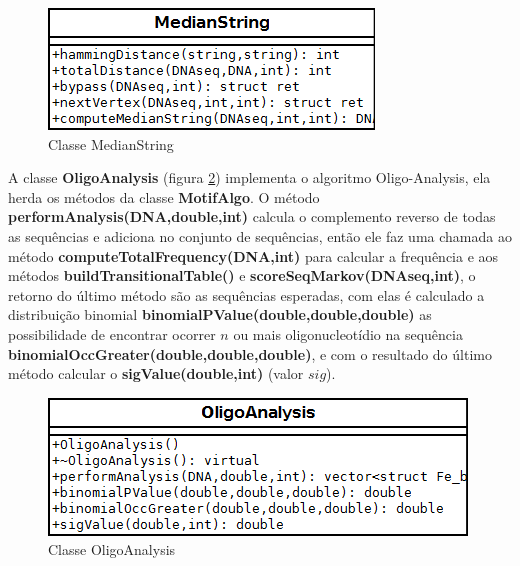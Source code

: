 \begin{figure}[htb!]
    \centering
    \includegraphics[scale=0.7]{./imagens/MedianString.png}
    \caption{Classe MedianString}
    \label{fig:MedianString}
\end{figure}


A classe \textbf{OligoAnalysis} (figura \ref{fig:OligoAnalysis}) implementa o algoritmo Oligo-Analysis, ela herda os métodos da classe \textbf{MotifAlgo}. O método \textbf{performAnalysis(DNA,double,int)} calcula o complemento reverso de todas as sequências e adiciona no conjunto de sequências, então ele faz uma chamada ao método \textbf{computeTotalFrequency(DNA,int)} para calcular a frequência e aos métodos \textbf{buildTransitionalTable()} e \textbf{scoreSeqMarkov(DNAseq,int)}, o retorno do último método são as sequências esperadas, com elas é calculado a distribuição binomial \textbf{binomialPValue(double,double,double)} as possibilidade de encontrar ocorrer $n$ ou mais oligonucleotídio na sequência \textbf{binomialOccGreater(double,double,double)}, e com o resultado do último método calcular o \textbf{sigValue(double,int)} (valor $sig$).


\begin{figure}[htb!]
    \centering
    \includegraphics[scale=0.7]{./imagens/OligoAnalysis.png}
    \caption{Classe OligoAnalysis}
    \label{fig:OligoAnalysis}
\end{figure}


